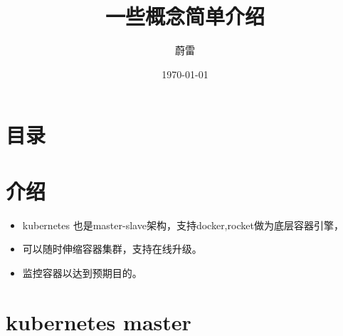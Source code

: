 \documentclass{beamer}
\title[kubernetes]{一些概念简单介绍}
\author{蔚雷}
\date{\today}
\begin{document}
\frame{\titlepage}  
  
\section*{目录}   
  
\frame{\tableofcontents}  
  
%  
%  
%  
%  
%  

\section{ 介绍}

\begin{frame}

	\begin{itemize}
		\item kubernetes 也是master-slave架构，支持docker,rocket做为底层容器引擎，
		\item 可以随时伸缩容器集群，支持在线升级。
		\item 监控容器以达到预期目的。
	\end{itemize}
\end{frame}
\section{kubernetes master}
\end{document}
